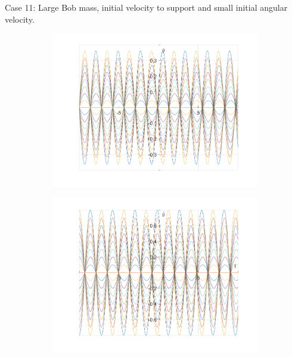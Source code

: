 \documentclass{article}
\begin{document}
	Case 11:
	Large Bob mass, initial velocity to support and small initial angular velocity.
	\begin{figure}[h!]
		\centering
		\begin{subfigure}[b]{0.48\linewidth}
			\includegraphics[width=\linewidth]{./SmallOscillations/S11/F1.png}
		\end{subfigure}
		\begin{subfigure}[b]{0.48\linewidth}
			\includegraphics[width=\linewidth]{./SmallOscillations/S11/F2.png}
		\end{subfigure}
	\end{figure}
\end{document}
